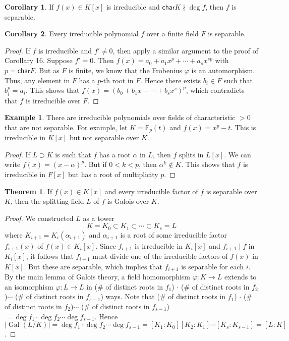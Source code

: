 \documentclass[10pt,letterpaper,cm]{nupset}
\theoremstyle{definition}
\newtheorem{exmp}{Example}
\newtheorem{theorem}{Theorem}
\newtheorem{corollary}{Corollary}
\newcommand{\F}{\mathbb F}
\newcommand{\1}{\mathbf{1}}
\newcommand{\0}{\vec 0}
\newcommand{\Char}{\mathsf{char}}
\DeclareMathOperator{\gal}{Gal}
\begin{document}
\begin{corollary}
If $f(x) \in K[x]$ is irreducible and $\Char{K} \nmid \deg{f}$, then $f$ is separable. 
\end{corollary}

\begin{corollary}
Every irreducible polynomial $f$ over a finite field $F$ is separable. 
\end{corollary}
\begin{proof}
If $f$ is irreducible and $f' \ne 0$, then apply a similar argument to the proof of Corollary 16. Suppose $f'=0$. Then $f(x) = a_0 + a_1x^p + \cdots + a_sx^{sp}$ with $p= \Char{F}$. But as $F$ is finite, we know that the Frobenius $\varphi$ is an automorphism. Thus, any element in $F$ has a $p$-th root in $F$. Hence there exists $b_i \in F$ such that $b_i^p = a_i$. This shows that $f(x) = (b_0 + b_1x + \cdots + b_sx^s)^p$, which contradicts that $f$ is irreducible over $F$.
\end{proof}

\begin{exmp}
There are irreducible polynomials over fields of characteristic $>0$ that are not separable. For example, let $K = \F_p(t)$ and $f(x) = x^p-t$. This is irreducible in $K[x]$ but not separable over $K$.
\end{exmp}
\begin{proof}
 If $L \supset K$ is such that $f$ has a root $\alpha$ in $L$, then $f$ splits in $L[x]$. We can write $f(x) = (x-\alpha)^p$. But if $0 <k < p$, then $\alpha^k \notin K$. This shows that $f$ is irreducible in $F[x]$ but has a root of multiplicity $p$.
\end{proof}

\begin{theorem}
If $f(x) \in K[x]$ and every irreducible factor of $f$ is separable over $K$, then the splitting field $L$ of $f$ is Galois over $K$.
\end{theorem}
\begin{proof}
We constructed $L$ as a tower $$K = K_0 \subset K_1 \subset \cdots \subset K_s = L$$ where $K_{i+1} = K_i(\alpha_{i+1})$ and $\alpha_{i+1}$  is a root of some irreducible factor $f_{i+1}(x)$ of $f(x)\in K_i[x]$. Since $f_{i+1}$ is irreducible in $K_i[x]$ and $f_{i+1} \mid f $ in $K_i[x]$, it follows that $f_{i+1}$ must divide one of the irreducible factors of $f(x)$ in $K[x]$. But these are separable, which implies that $f_{i+1}$ is separable for each $i$. By the main lemma of Galois theory, a field homomorphism $\varphi : K \to L$ extends to an isomorphism $\varphi : L \to L$ in (\# of distinct roots in $f_1$) $\cdot$ (\# of distinct roots in $f_2$)$\cdots$ (\# of distinct roots in $f_{s-1}$) ways. Note that (\# of distinct roots in $f_1$) $\cdot$ (\# of distinct roots in $f_2$)$\cdots$ (\# of distinct roots in $f_{s-1}$) $= \deg{f_1}\cdot \deg{f_2} \cdots \deg{f_{s-1}}$. Hence $\lvert{\gal(L/K)}\rvert = \deg{f_1}\cdot \deg{f_2} \cdots \deg{f_{s-1}} = [K_1: K_0][K_2: K_1] \cdots [K_s: K_{s-1}] = [L:K]$.
\end{proof}
\end{document}
